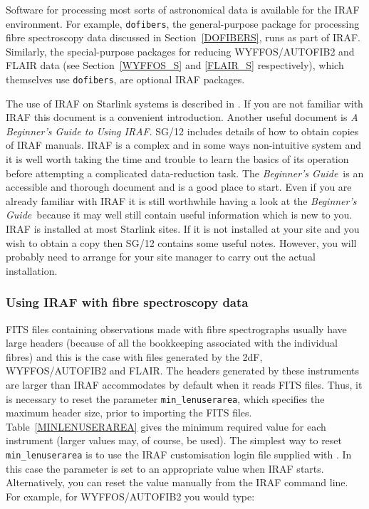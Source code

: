 \documentclass[chapters,twoside,11pt]{starlink}
\begin{document}
Software for processing most sorts of astronomical data is available
for the IRAF environment.  For example, \texttt{dofibers}, the
general-purpose package for processing fibre spectroscopy data
discussed in Section~\ref{DOFIBERS}, runs as part of IRAF.  Similarly,
the special-purpose packages for reducing WYFFOS/AUTOFIB2 and FLAIR
data (see Section~\ref{WYFFOS_S} and \ref{FLAIR_S} respectively),
which themselves use \texttt{dofibers}, are optional IRAF packages.

The use of IRAF on Starlink systems is described in
\/\cite{SG12}.
If you are not familiar with IRAF this document is a convenient
introduction.  Another useful document is \textit{A Beginner's Guide to
Using IRAF}\/\cite{BARNES93}.  SG/12 includes details of how to obtain
copies of IRAF manuals.  IRAF is a complex and in some ways
non-intuitive system and it is well worth taking the time and trouble
to learn the basics of its operation before attempting a complicated
data-reduction task.  The \textit{Beginner's Guide}\, is an accessible and
thorough document and is a good place to start.  Even if you are already
familiar with IRAF it is still worthwhile having a look at the \textit{Beginner's Guide}\, because it may well still contain useful information
which is new to you.  IRAF is installed at most Starlink sites.
If it is not installed at your site and you wish to obtain a copy then
SG/12 contains some useful notes.  However, you will probably need to
arrange for your site manager to carry out the actual installation.

\subsubsection{\label{IRAFIBSP}Using IRAF with fibre spectroscopy data}

FITS files containing observations made with fibre spectrographs
usually have large headers (because of all the bookkeeping associated
with the individual fibres) and this is the case with files generated
by the 2dF, WYFFOS/AUTOFIB2 and FLAIR.  The headers generated by these
instruments are larger than IRAF accommodates by default when it reads
FITS files.  Thus, it is necessary to reset the parameter \texttt{min\_lenuserarea}, which specifies the maximum header size, prior
to importing the FITS files.  Table~\ref{MINLENUSERAREA} gives the
minimum required value for each instrument (larger values may, of
course, be used).  The simplest way to reset \texttt{min\_lenuserarea} is
to use the IRAF customisation login file supplied with
\/\cite{SG12}.  In this case the parameter is set
to an appropriate value when IRAF starts.  Alternatively, you can reset
the value manually from the IRAF command line.  For example, for
WYFFOS/AUTOFIB2 you would type:
\end{document}
